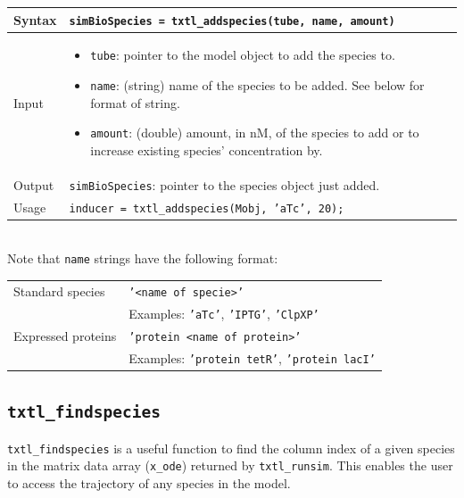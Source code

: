 \documentclass[english]{report}
\begin{document}
			\begin{tabular}{p{2cm}|p{13cm}}
			Syntax & \texttt{simBioSpecies = txtl\_addspecies(tube, name, amount)}\\ \hline
			Input &  \begin{itemize}
				\item \texttt{tube}: pointer to the model object to add the species to.
				\item \texttt{name}: (string) name of the species to be added. See below for format of string.  
				\item \texttt{amount}: (double) amount, in nM, of the species to add or to increase existing species' concentration by. 
				\end{itemize} \\ \hline
			Output & \texttt{simBioSpecies}: pointer to the species object just added.\\ \hline
			Usage & \texttt{inducer = txtl\_addspecies(Mobj, 'aTc', 20);}\\
			\end{tabular} \\
			
			
			Note that \texttt{name} strings have the following format: \\
			
			\begin{tabular}{|p{2cm}|p{13cm}|}
			\hline
			Standard species & \texttt{'<name of specie>'}\\ 
			& Examples: \texttt{'aTc'},  \texttt{'IPTG'},  \texttt{'ClpXP'} \\ \hline
			Expressed proteins & \texttt{'protein <name of protein>'} \\
			& Examples: \texttt{'protein tetR'},  \texttt{'protein lacI'} \\ \hline
			\end{tabular}
					
					
		\subsection*{\texttt{txtl\_findspecies}}
			\texttt{txtl\_findspecies} is a useful function to find the column index of a given species in the matrix data array (\texttt{x\_ode}) returned by \texttt{txtl\_runsim}. This enables the user to access the trajectory of any species in the model. \\
			
\end{document}

